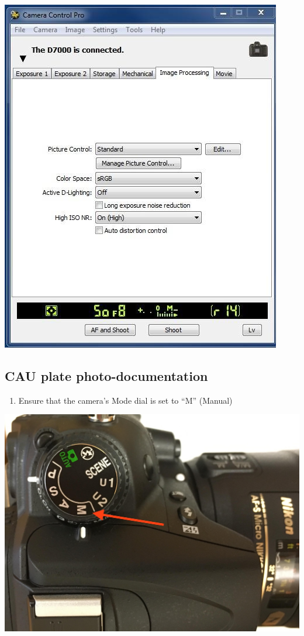 \documentclass[
]{book}
\providecommand{\tightlist}{%
  \setlength{\itemsep}{0pt}\setlength{\parskip}{0pt}}
\begin{document}
\includegraphics{images/Camera6.jpg}

\hypertarget{cau-plate-photo-documentation}{%
\subsection{CAU plate photo-documentation}\label{cau-plate-photo-documentation}}

\begin{enumerate}
\def\labelenumi{\arabic{enumi}.}
\tightlist
\item
  Ensure that the camera's Mode dial is set to ``M'' (Manual)
\end{enumerate}

\includegraphics{images/Camera7.jpg}
\end{document}
